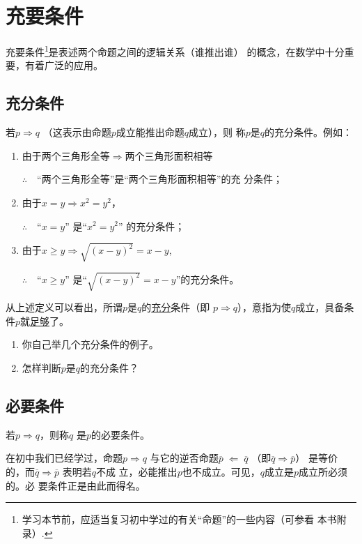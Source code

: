 \section{充要条件}

充要条件\footnote{学习本节前，应适当复习初中学过的有关“命题”的一些内容（可参看
本书附录）.}是表述两个命题之间的逻辑关系（谁推出谁）
的概念，在数学中十分重要，有着广泛的应用。

\subsection{充分条件}

若$p\Longrightarrow q$ （这表示由命题$p$成立能推出命题$q$成立），则
称$p$是$q$的充分条件。例如：
\begin{enumerate}[(1)]
    \item 由于两个三角形全等$\Longrightarrow$两个三角形面积相等
    
$\therefore\quad $“两个三角形全等”是“两个三角形面积相等”的充
分条件；
\item 由于$x=y\Longrightarrow x^2=y^2$，

$\therefore\quad $“$x=y$”
是“$x^2=y^2$”
的充分条件；
\item 由于$x\ge y\Longrightarrow \sqrt{(x-y)^2}=x-y$,

$\therefore\quad $“$x\ge y$”
是“$\sqrt{(x-y)^2}=x-y$”的充分条件。
\end{enumerate}

从上述定义可以看出，所谓$p$是$q$的\underline{充分}条件（即
$p\Longrightarrow q$），意指为使$q$成立，具备条件$p$就\underline{足够}了。

\begin{blk}
\begin{enumerate}[(1)]
    \item 你自己举几个充分条件的例子。
    \item 怎样判断$p$是$q$的充分条件？
\end{enumerate}
\end{blk}

\subsection{必要条件}
若$p\Longrightarrow q$，则称$q$
是$p$的必要条件。

\begin{note}
    在初中我们已经学过，命题$p\Longrightarrow q$
与它的逆否命题$\overline{p}\;\Leftarrow \; \overline{q}$
（即$\overline{q}\Longrightarrow\overline{p}$）
是等价的，而$\overline{q}\Longrightarrow\overline{p}$
表明若$q$不成
立，必能推出$p$也不成立。可见，$q$成立是$p$成立所必须的。必
要条件正是由此而得名。
\end{note}

